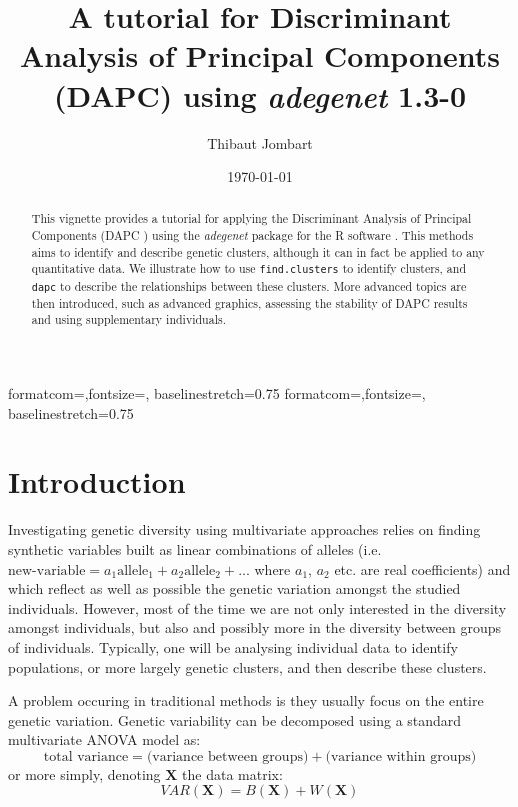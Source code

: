 \documentclass{article}
\title{A tutorial for Discriminant Analysis of Principal Components (DAPC) using \textit{adegenet} 1.3-0}
\author{Thibaut Jombart}
\date{\today}
\newcommand{\m}[1]{\mathbf{#1}}
\newcommand{\code}[1]{{{\tt #1}}}
\begin{document}
{formatcom={\color{Sinput}},fontsize=\footnotesize, baselinestretch=0.75}
{formatcom={\color{Soutput}},fontsize=\footnotesize, baselinestretch=0.75}

\color{black}

\maketitle

\begin{abstract}
  This vignette provides a tutorial for applying the Discriminant Analysis of Principal Components
  (DAPC \cite{tjart19}) using the \textit{adegenet} package \cite{tjart05} for the R software
  \cite{np145}. This methods aims to identify and describe genetic clusters, although it can in fact
  be applied to any quantitative data. We illustrate how to use \code{find.clusters} to identify
  clusters, and \code{dapc} to describe the relationships between these clusters. More advanced
  topics are then introduced, such as advanced graphics, assessing the stability of DAPC results and
  using supplementary individuals.
\end{abstract}


\newpage
\tableofcontents


\newpage
\section{Introduction}


Investigating genetic diversity using multivariate approaches relies on finding synthetic variables
built as linear combinations of alleles (i.e. $\mbox{new-variable} = a_1 \mbox{allele}_1 + a_2 \mbox{allele}_2 + ... $
where $a_1$, $a_2$ etc. are real coefficients)
and which reflect as well as possible the genetic variation amongst the studied individuals.
However, most of the time we are not only interested in the diversity amongst individuals, but
also and possibly more in the diversity between groups of individuals.
Typically, one will be analysing individual data to identify populations, or more largely genetic
clusters, and then describe these clusters.

A problem occuring in traditional methods is they usually focus on the entire genetic variation.
Genetic variability can be decomposed using a standard multivariate ANOVA model as:
$$
\mbox{total variance} = \mbox{(variance between groups)} + \mbox{(variance within groups)}
$$
or more simply, denoting $\m{X}$ the data matrix:
$$
VAR(\m{X}) = B(\m{X}) + W(\m{X})
$$
\end{document}
